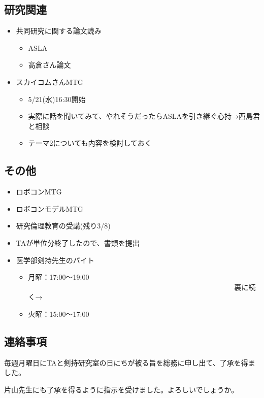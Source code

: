 \documentclass[uplatex, onecolumn, 10pt]{jsarticle}
\begin{document}
\subsection*{研究関連}
\begin{itemize}
	\item 共同研究に関する論文読み
	\begin{itemize}
		\item ASLA
		\item 高倉さん論文
	\end{itemize}
	\item スカイコムさんMTG
	\begin{itemize}
		\item 5/21(水)16:30開始
		\item 実際に話を聞いてみて、やれそうだったらASLAを引き継ぐ心持→西島君と相談
		\item テーマ2についても内容を検討しておく
	\end{itemize}
\end{itemize}

\subsection*{その他}
\begin{itemize}
    \item ロボコンMTG
    \item ロボコンモデルMTG
    \item 研究倫理教育の受講(残り3/8)
    \item TAが単位分終了したので、書類を提出
    \item 医学部剣持先生のバイト
    \begin{itemize}
		\item 月曜：17:00～19:00  　　　　　　　　　　　　　　　　　　　　　　　　　　　　　裏に続く→
		\item 火曜：15:00～17:00
	\end{itemize}
\end{itemize}

\subsection*{連絡事項}
毎週月曜日にTAと剣持研究室の日にちが被る旨を総務に申し出て、了承を得ました。

片山先生にも了承を得るように指示を受けました。よろしいでしょうか。
\end{document}
